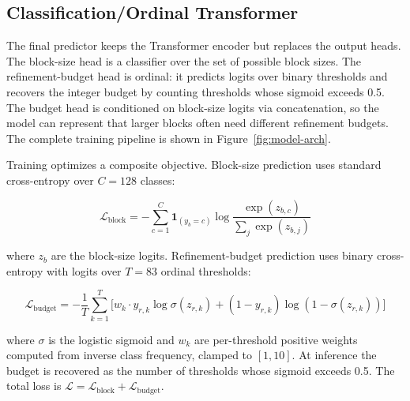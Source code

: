\documentclass[11pt]{article}
\begin{document}
\subsection{Classification/Ordinal Transformer}

The final predictor keeps the Transformer encoder but replaces the output heads. The block-size head is a classifier over the set of possible block sizes. The refinement-budget head is ordinal: it predicts logits over binary thresholds and recovers the integer budget by counting thresholds whose sigmoid exceeds 0.5. The budget head is conditioned on block-size logits via concatenation, so the model can represent that larger blocks often need different refinement budgets. The complete training pipeline is shown in Figure~\ref{fig:model-arch}.

Training optimizes a composite objective. Block-size prediction uses standard cross-entropy over \(C = 128\) classes:

\[
\mathcal{L}_{\text{block}} = -\sum_{c=1}^{C} \mathbf{1}_{(y_b = c)} \log \frac{\exp(z_{b,c})}{\sum_j \exp(z_{b,j})}
\]

where \(z_b\) are the block-size logits. Refinement-budget prediction uses binary cross-entropy with logits over \(T = 83\) ordinal thresholds:

\[
\mathcal{L}_{\text{budget}} = -\frac{1}{T}\sum_{k=1}^{T} \big[ w_k \cdot y_{r,k} \log\sigma(z_{r,k}) + (1 - y_{r,k})\log(1 - \sigma(z_{r,k})) \big]
\]

where \(\sigma\) is the logistic sigmoid and \(w_k\) are per-threshold positive weights computed from inverse class frequency, clamped to \([1, 10]\). At inference the budget is recovered as the number of thresholds whose sigmoid exceeds 0.5. The total loss is \(\mathcal{L} = \mathcal{L}_{\text{block}} + \mathcal{L}_{\text{budget}}\).
\end{document}
